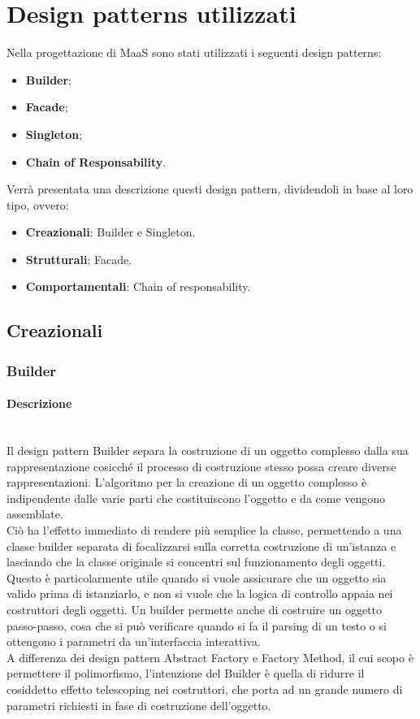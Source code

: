 \newpage
\section{Design patterns utilizzati}
Nella progettazione di MaaS sono stati utilizzati i seguenti design patterns:
\begin{itemize}
\item \textbf{Builder};
\item \textbf{Facade};
\item \textbf{Singleton};
\item \textbf{Chain of Responsability}.
\end{itemize}
Verrà presentata una descrizione questi design pattern, dividendoli in base al loro tipo, ovvero:
\begin{itemize}
\item \textbf{Creazionali}: Builder e Singleton.
\item \textbf{Strutturali}: Facade.
\item \textbf{Comportamentali}: Chain of responsability.
\end{itemize}
\subsection{Creazionali}
\subsubsection{Builder}
\paragraph{Descrizione} \mbox{} \\
Il design pattern Builder separa la costruzione di un oggetto complesso dalla sua rappresentazione cosicché il processo di costruzione stesso possa creare diverse rappresentazioni. L'algoritmo per la creazione di un oggetto complesso è indipendente dalle varie parti che costituiscono l'oggetto e da come vengono assemblate. \\
Ciò ha l'effetto immediato di rendere più semplice la classe, permettendo a una classe builder separata di focalizzarsi sulla corretta costruzione di un'istanza e lasciando che la classe originale si concentri sul funzionamento degli oggetti. Questo è particolarmente utile quando si vuole assicurare che un oggetto sia valido prima di istanziarlo, e non si vuole che la logica di controllo appaia nei costruttori degli oggetti. Un builder permette anche di costruire un oggetto passo-passo, cosa che si può verificare quando si fa il parsing di un testo o si ottengono i parametri da un'interfaccia interattiva. \\
A differenza dei design pattern Abstract Factory e Factory Method, il cui scopo è permettere il polimorfismo, l'intenzione del Builder è quella di ridurre il cosiddetto effetto telescoping nei costruttori, che porta ad un grande numero di parametri richiesti in fase di costruzione dell'oggetto.
